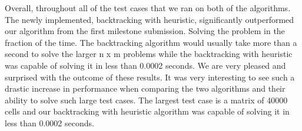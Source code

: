 \documentclass{article}
\begin{document}
\bigskip

Overall, throughout all of the test cases that we ran on both of the algorithms. 
The newly implemented, backtracking with heuristic, significantly outperformed 
our algorithm from the first milestone submission. Solving the problem in the 
fraction of the time. The backtracking algorithm would usually take more than a second
to solve the larger n x m problems while the backtracking with heuristic was capable of
solving it in less than 0.0002 seconds. We are very pleased and surprised with the outcome
of these results. It was very interesting to see such a drastic increase in performance 
when comparing the two algorithms and their ability to solve such large test cases. The largest
test case is a matrix of 40000 cells and our backtracking with heuristic algorithm was capable
of solving it in less than 0.0002 seconds.







\end{document}
